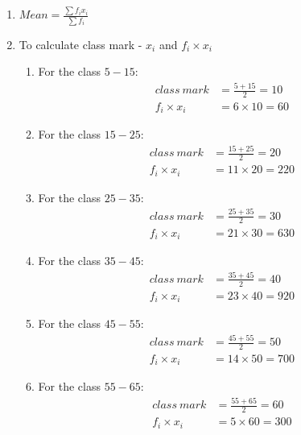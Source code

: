 \renewcommand{\theequation}{\theenumi}
\begin{enumerate}

\item $Mean = \frac{\sum f_i x_i}{\sum f_i}$

\item To calculate class mark - $x_i$ and $f_i \times x_i$
\begin{enumerate}

\item For the class $5-15$:
\begin{align*}
class\ mark &= \frac{5+15}{2} = 10\\
f_i \times x_i &= 6 \times 10 = 60 
\end{align*}

\item For the class $15-25$:
\begin{align*}
class\ mark &= \frac{15+25}{2} = 20\\
f_i \times x_i &= 11 \times 20 = 220 
\end{align*}

\item For the class $25-35$:
\begin{align*}
class\ mark &= \frac{25+35}{2} = 30\\
f_i \times x_i &= 21 \times 30 = 630 
\end{align*}

\item For the class $35-45$:
\begin{align*}
class\ mark &= \frac{35+45}{2} = 40\\
f_i \times x_i &= 23 \times 40 = 920 
\end{align*}

\item For the class $45-55$:
\begin{align*}
class\ mark &= \frac{45+55}{2} = 50\\
f_i \times x_i &= 14 \times 50 = 700 
\end{align*}

\item For the class $55-65$:
\begin{align*}
class\ mark &= \frac{55+65}{2} = 60\\
f_i \times x_i &= 5 \times 60 = 300 
\end{align*}

\end{enumerate}

%


\end{enumerate}
